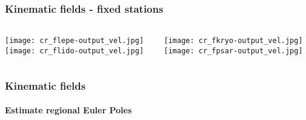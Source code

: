 \begin{frame}
  \frametitle{Kinematic fields -  fixed stations}
  \framesubtitle{}
  \label{}
  \vskip-1cm
  \begin{columns}[T]
    \begin{column}{.5\textwidth}
      \begin{center}
        \texttt{[image: cr\_flepe-output\_vel.jpg]}\\[.1em]
        \texttt{[image: cr\_flido-output\_vel.jpg]}
      \end{center} 
    \end{column}
    \begin{column}{.5\textwidth}
      \begin{center}
        \texttt{[image: cr\_fkryo-output\_vel.jpg]}\\[.1em]
        \texttt{[image: cr\_fpsar-output\_vel.jpg]}
      \end{center} 
    \end{column}
  \end{columns}
\end{frame}
\note{}

\begin{frame}
  \frametitle{Kinematic fields}
  \framesubtitle{Estimate regional Euler Poles}
  \label{}

\end{frame}
\note{}

% 	  
%
%
%        


